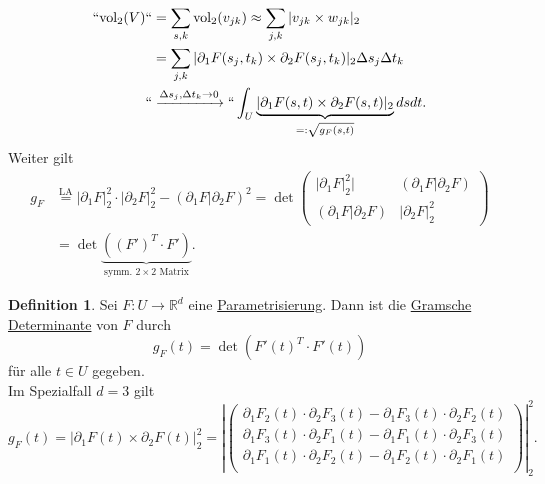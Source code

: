 \documentclass[a4paper]{report}
\newcommand{\R}{\mathbb{R}}
\newcommand{\jlabel}[1]{\label{j_#1}}
\newcommand{\jterm}[1]{\jlabel{#1}\uline{#1}}
\newcommand{\jhyperref}[2]{\hyperref[j_#1]{#2}}
\newcommand{\jlink}[1]{\jhyperref{#1}{#1}}
\newcommand{\jabb}[3]{ #1: #2 \rightarrow #3 }
\theoremstyle{plain}
\theoremstyle{definition}
\newtheorem{defn}[thm]{Definition}
\begin{document}
{{{{\[
    \begin{split}
        ``\text{vol}_2(V)`` &= \sum_{s,k} \text{vol}_2 (v_{jk}) \approx \sum_{j,k} |v_{jk} \times w_{jk}|_2\\
                            &= \sum_{j,k} |\partial_1 F(s_j,t_k) \times \partial_2 F(s_j,t_k)|_2 \Delta s_j \Delta t_k\\
                            ``&\xrightarrow{\Delta s_j, \Delta t_k \rightarrow 0}`` \int_U \underbrace{|\partial_1 F(s,t) \times \partial_2 F(s,t) |_2}_{=: \sqrt{g_F(s,t)}} ds dt.
    \end{split}
\]
Weiter gilt
\[
    \begin{split}
        g_F &\overset{\text{LA}}{=} |\partial_1 F|_2^2 \cdot |\partial_2 F|_2^2 - (\partial_1 F| \partial_2 F)^2 = \det \begin{pmatrix}
                                                                                                                           |\partial_1 F|_2^2| & (\partial_1 F| \partial_2 F) \\
                                                                                                                           (\partial_1 F| \partial_2 F) & |\partial_2 F|_2^2
                                                                                                                         \end{pmatrix}\\
            &=\det \underbrace{\left((F')^T \cdot F'\right)}_{\text{symm. } 2\times 2 \text{ Matrix}}.
    \end{split}                                                                                                                        
\]

\begin{defn}
    \jlabel{Def 4.8}
    Sei $\jabb{F}{U}{\R^d}$ eine \jlink{Parametrisierung}. Dann ist die \jterm{Gramsche Determinante} von $F$ durch
    \[
        g_F(t) = \det \left( F'(t)^T \cdot F'(t) \right)
    \]
    für alle $t\in U$ gegeben.\\
    Im Spezialfall $d=3$ gilt
    \[
        g_F(t) = |\partial_1 F(t) \times \partial_2 F(t)|_2^2 = \left|\begin{pmatrix}
                                                                        \partial_1 F_2(t)\cdot \partial_2 F_3(t) - \partial_1 F_3(t)\cdot \partial_2 F_2(t) \\
                                                                        \partial_1 F_3(t)\cdot \partial_2 F_1(t) - \partial_1 F_1(t)\cdot \partial_2 F_3(t) \\
                                                                        \partial_1 F_1(t)\cdot \partial_2 F_2(t) - \partial_1 F_2(t)\cdot \partial_2 F_1(t) \\
                                                                     \end{pmatrix} \right |_2^2.
    \]
\end{defn}

}}}}
\end{document}
